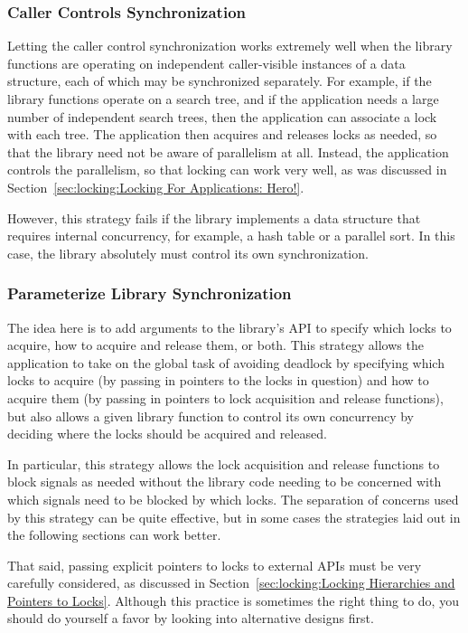 \subsubsection{Caller Controls Synchronization}
\label{sec:locking:Caller Controls Synchronization}

Letting the caller control synchronization
works extremely well when the library functions are operating
on independent caller-visible instances of a data structure, each
of which may be synchronized separately.
For example, if the library functions operate on a search tree,
and if the application needs a large number of independent search
trees, then the application can associate a lock with each tree.
The application then acquires and releases locks as needed, so
that the library need not be aware of parallelism at all.
Instead, the application controls the parallelism, so that locking
can work very well, as was discussed in
Section~\ref{sec:locking:Locking For Applications: Hero!}.

However, this strategy fails if the
library implements a data structure that requires internal
concurrency, for example, a hash table or a parallel sort.
In this case, the library absolutely must control its own
synchronization.

\subsubsection{Parameterize Library Synchronization}
\label{sec:locking:Parameterize Library Synchronization}

The idea here is to add arguments to the library's API to specify
which locks to acquire, how to acquire and release them, or both.
This strategy allows the application to take on the global task of
avoiding deadlock by specifying which locks to acquire (by passing in
pointers to the locks in question) and how to
acquire them (by passing in pointers to lock acquisition and release
functions),
but also allows a given library function to control its own concurrency
by deciding where the locks should be acquired and released.

In particular, this strategy allows the lock acquisition and release
functions to block signals as needed without the library code needing to
be concerned with which signals need to be blocked by which locks.
The separation of concerns used by this strategy can be quite effective,
but in some cases the strategies laid out in the following sections
can work better.

That said, passing explicit pointers to locks to external APIs must
be very carefully considered, as discussed in
Section~\ref{sec:locking:Locking Hierarchies and Pointers to Locks}.
Although this practice is sometimes the right thing to do, you should do
yourself a favor by looking into alternative designs first.


